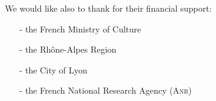 We would like also to thank for their financial support:
\begin{itemize}
\item[-]the French Ministry of Culture
\item[-]the Rh\^one-Alpes Region
\item[-]the City of Lyon
\item[-]the French National Research Agency (\textsc{Anr})
\end{itemize}


